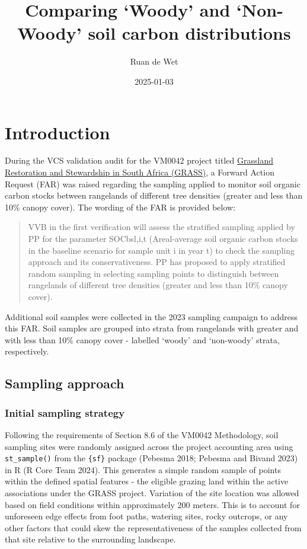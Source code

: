 \documentclass[
  letterpaper,
  DIV=11,
  numbers=noendperiod]{scrartcl}
\title{Comparing `Woody' and `Non-Woody' soil carbon distributions}
\author{Ruan de Wet}
\date{2025-01-03}
\renewcommand*\contentsname{Table of contents}
\newcommand\contentsname{Table of contents}
\begin{document}
\maketitle

\renewcommand*\contentsname{Table of contents}
{
\hypersetup{linkcolor=}
\setcounter{tocdepth}{3}
\tableofcontents
}

\section{Introduction}\label{introduction}

During the VCS validation audit for the VM0042 project titled
\href{https://registry.verra.org/app/projectDetail/VCS/2349}{Grassland
Restoration and Stewardship in South Africa (GRASS)}, a Forward Action
Request (FAR) was raised regarding the sampling applied to monitor soil
organic carbon stocks between rangelands of different tree densities
(greater and less than 10\% canopy cover). The wording of the FAR is
provided below:

\begin{quote}
VVB in the first verification will assess the stratified sampling
applied by PP for the parameter SOCbsl,i,t (Areal-average soil organic
carbon stocks in the baseline scenario for sample unit i in year t) to
check the sampling approach and its conservativeness. PP has proposed to
apply stratified random sampling in selecting sampling points to
distinguish between rangelands of different tree densities (greater and
less than 10\% canopy cover).
\end{quote}

Additional soil samples were collected in the 2023 sampling campaign to
address this FAR. Soil samples are grouped into strata from rangelands
with greater and with less than 10\% canopy cover - labelled `woody' and
`non-woody' strata, respectively.

\subsection{Sampling approach}\label{sampling-approach}

\subsubsection{Initial sampling
strategy}\label{initial-sampling-strategy}

Following the requirements of Section 8.6 of the VM0042 Methodology,
soil sampling sites were randomly assigned across the project accounting
area using \texttt{st\_sample()} from the \texttt{\{sf\}} package
(Pebesma 2018; Pebesma and Bivand 2023) in R (R Core Team 2024). This
generates a simple random sample of points within the defined spatial
features - the eligible grazing land within the active associations
under the GRASS project. Variation of the site location was allowed
based on field conditions within approximately 200 meters. This is to
account for unforeseen edge effects from foot paths, watering sites,
rocky outcrops, or any other factors that could skew the
representativeness of the samples collected from that site relative to
the surrounding landscape.
\end{document}
